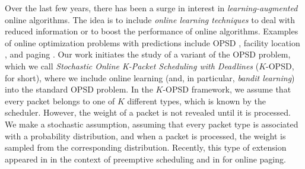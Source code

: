 


Over the last few years, there has been a surge in interest in \textit{learning-augmented} online algorithms. The idea is to include \textit{online learning techniques} to deal with reduced information or to boost the performance of online algorithms. Examples of online optimization problems with predictions include OPSD \citep{liang2023learning}, facility location \citep{agrawal2022learning}, and paging \citep{bansal2022learning}. Our work initiates the study of a variant of the OPSD problem, which we call \textit{Stochastic Online K-Packet Scheduling with Deadlines} ($K$-OPSD, for short), where we include online learning (and, in particular, \textit{bandit learning}) into the standard OPSD problem. In the $K$-OPSD framework, we assume that every packet belongs to one of $K$ different types, which is known by the scheduler. However, the weight of a packet is not revealed until it is processed. We make a stochastic assumption, assuming that every packet type is associated with a probability distribution, and when a packet is processed, the weight is sampled from the corresponding distribution. Recently, this type of extension appeared in \cite{merlis2023preemption} in the context of preemptive scheduling and in \cite{levy2024online} for online paging.

